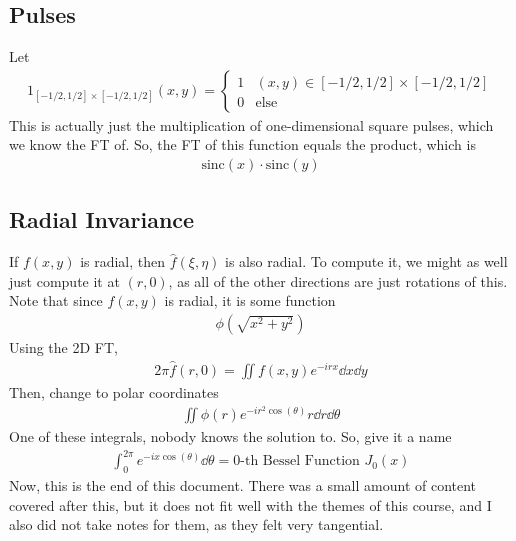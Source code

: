 \subsection{Pulses}
Let
\begin{align}
    1_{[-1/2, 1/2] \times [-1/2, 1/2]}(x,y) = \begin{cases}
        1 & (x,y) \in [-1/2, 1/2] \times [-1/2, 1/2]\\
        0 & \text{else}
    \end{cases}
\end{align}
This is actually just the multiplication of one-dimensional square pulses, which we know the FT of. So, the FT of this function equals the product, which is
\begin{align}
    \text{sinc}(x) \cdot \text{sinc}(y)
\end{align}

\subsection{Radial Invariance}
If $f(x,y)$ is radial, then $\hat{f}(\xi, \eta)$ is also radial. To compute it, we might as well just compute it at $(r, 0)$, as all of the other directions are just rotations of this. Note that since $f(x, y)$ is radial, it is some function
\begin{align}
    \phi(\sqrt{x^2 + y^2})
\end{align}
Using the 2D FT,
\begin{align}
    2\pi \hat{f}(r, 0) = \iint f(x, y) e^{-irx} \dd{x}\dd{y}
\end{align}
Then, change to polar coordinates
\begin{align}
    \iint \phi(r) e^{-ir^2\cos(\theta)} r\dd{r}\dd{\theta}
\end{align}
One of these integrals, nobody knows the solution to. So, give it a name
\begin{align}
    \int_0^{2\pi} e^{-ix\cos(\theta)} \dd{\theta} = 0\text{-th Bessel Function $J_0(x)$}
\end{align}
Now, this is the end of this document. There was a small amount of content covered after this, but it does not fit well with the themes of this course, and I also did not take notes for them, as they felt very tangential.